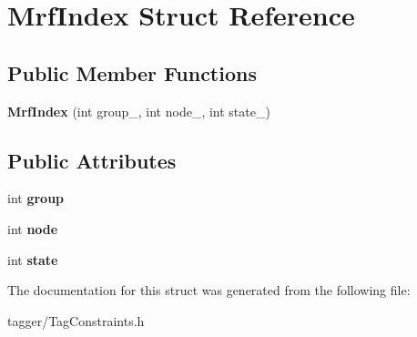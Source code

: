 \hypertarget{struct_mrf_index}{
\section{MrfIndex Struct Reference}
\label{struct_mrf_index}
}
\subsection*{Public Member Functions}
\begin{DoxyCompactItemize}
\item 
\hypertarget{struct_mrf_index_adc62126e39eeccb67aed83b8d33514e9}{
{\bfseries MrfIndex} (int group\_\-, int node\_\-, int state\_\-)}
\label{struct_mrf_index_adc62126e39eeccb67aed83b8d33514e9}

\end{DoxyCompactItemize}
\subsection*{Public Attributes}
\begin{DoxyCompactItemize}
\item 
\hypertarget{struct_mrf_index_a10be38457b3798cfdf70f224814ce8eb}{
int {\bfseries group}}
\label{struct_mrf_index_a10be38457b3798cfdf70f224814ce8eb}

\item 
\hypertarget{struct_mrf_index_a9c765fbc8576d8d6541a072eb75c2c8a}{
int {\bfseries node}}
\label{struct_mrf_index_a9c765fbc8576d8d6541a072eb75c2c8a}

\item 
\hypertarget{struct_mrf_index_a2cea032a5c169945c3c0e8d96fbc1477}{
int {\bfseries state}}
\label{struct_mrf_index_a2cea032a5c169945c3c0e8d96fbc1477}

\end{DoxyCompactItemize}


The documentation for this struct was generated from the following file:\begin{DoxyCompactItemize}
\item 
tagger/TagConstraints.h\end{DoxyCompactItemize}
